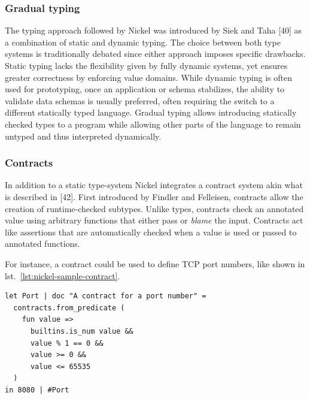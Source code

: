 \documentclass[
  a4paper,
  bibtex,
  english,
  nomenclature]{kthlatex/kththesis/kththesis}
\begin{document}
\hypertarget{sec:gradual-typing}{%
\subsubsection{Gradual typing}\label{sec:gradual-typing}}

The typing approach followed by Nickel was introduced by Siek and Taha
{[}40{]} as a combination of static and dynamic typing. The choice
between both type systems is traditionally debated since either approach
imposes specific drawbacks. Static typing lacks the flexibility given by
fully dynamic systems, yet ensures greater correctness by enforcing
value domains. While dynamic typing is often used for prototyping, once
an application or schema stabilizes, the ability to validate data
schemas is usually preferred, often requiring the switch to a different
statically typed language. Gradual typing allows introducing statically
checked types to a program while allowing other parts of the language to
remain untyped and thus interpreted dynamically.

\hypertarget{sec:contracts}{%
\subsubsection{Contracts}\label{sec:contracts}}

In addition to a static type-system Nickel integrates a contract system
akin what is described in {[}42{]}. First introduced by Findler and
Felleisen, contracts allow the creation of runtime-checked subtypes.
Unlike types, contracts check an annotated value using arbitrary
functions that either pass or \emph{blame} the input. Contracts act like
assertions that are automatically checked when a value is used or passed
to annotated functions.

For instance, a contract could be used to define TCP port numbers, like
shown in lst.~\ref{lst:nickel-sample-contract}.

\begin{codelisting}

\caption{Sample Contract ensuring that a value is a valid TCP port number}

\hypertarget{lst:nickel-sample-contract}{%
\label{lst:nickel-sample-contract}}%
\begin{verbatim}
let Port | doc "A contract for a port number" =
  contracts.from_predicate (
    fun value =>
      builtins.is_num value &&
      value % 1 == 0 &&
      value >= 0 &&
      value <= 65535
  )
in 8080 | #Port
\end{verbatim}

\end{codelisting}
\end{document}
